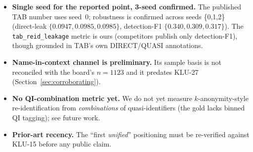 \documentclass[11pt]{article}
\begin{document}
\begin{itemize}
        $7$th on the TAB direct-identifier axis (leak $0.674$). Both are public; we do not conflate
        the two.
  \item \textbf{Single seed for the reported point, 3-seed confirmed.} The published TAB number uses
        seed~0; robustness is confirmed across seeds \{0,1,2\} (direct-leak $\{0.0947,0.0985,0.0985\}$,
        detection-F1 $\{0.340,0.309,0.317\}$). The \texttt{tab\_reid\_leakage} metric is ours
        (competitors publish only detection-F1), though grounded in TAB's own DIRECT/QUASI annotations.
  \item \textbf{Name-in-context channel is preliminary.} Its sample basis is not reconciled with the
        board's $n{=}1123$ and it predates KLU-27 (Section~\ref{sec:corroborating}).
  \item \textbf{No QI-combination metric yet.} We do not yet measure $k$-anonymity-style
        re-identification from \emph{combinations} of quasi-identifiers (the gold lacks binned QI
        tagging); see future work.
  \item \textbf{Prior-art recency.} The ``first \emph{unified}'' positioning must be re-verified
        against KLU-15 before any public claim.
\end{itemize}
\end{document}
